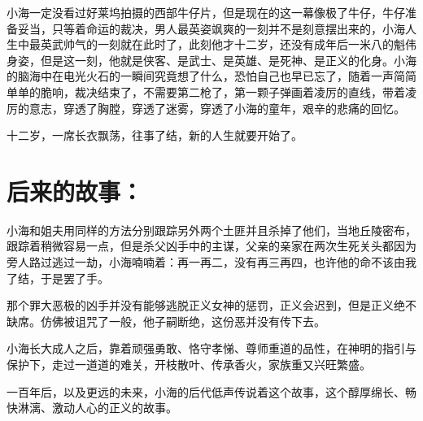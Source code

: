 小海一定没看过好莱坞拍摄的西部牛仔片，但是现在的这一幕像极了牛仔，牛仔准备妥当，只等着命运的裁决，男人最英姿飒爽的一刻并不是刻意摆出来的，小海人生中最英武帅气的一刻就在此时了，此刻他才十二岁，还没有成年后一米八的魁伟身姿，但是这一刻，他就是侠客、是武士、是英雄、是死神、是正义的化身。小海的脑海中在电光火石的一瞬间究竟想了什么，恐怕自己也早已忘了，随着一声简简单单的脆响，裁决结束了，不需要第二枪了，第一颗子弹画着凌厉的直线，带着凌厉的意志，穿透了胸膛，穿透了迷雾，穿透了小海的童年，艰辛的悲痛的回忆。

十二岁，一席长衣飘荡，往事了结，新的人生就要开始了。


\section*{后来的故事：}

小海和姐夫用同样的方法分别跟踪另外两个土匪并且杀掉了他们，当地丘陵密布，跟踪着稍微容易一点，但是杀父凶手中的主谋，父亲的亲家在两次生死关头都因为旁人路过逃过一劫，小海喃喃着：再一再二，没有再三再四，也许他的命不该由我了结，于是罢了手。

那个罪大恶极的凶手并没有能够逃脱正义女神的惩罚，正义会迟到，但是正义绝不缺席。仿佛被诅咒了一般，他子嗣断绝，这份恶并没有传下去。

小海长大成人之后，靠着顽强勇敢、恪守孝悌、尊师重道的品性，在神明的指引与保护下，走过一道道的难关，开枝散叶、传承香火，家族重又兴旺繁盛。

一百年后，以及更远的未来，小海的后代低声传说着这个故事，这个醇厚绵长、畅快淋漓、激动人心的正义的故事。

